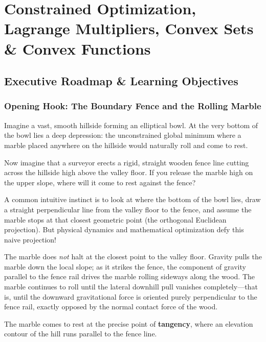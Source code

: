 \chapter[Constrained Optimization \& Convex Sets]{Constrained Optimization, Lagrange Multipliers, Convex Sets \& Convex Functions}
\label{chap:week09}

\section{Executive Roadmap \& Learning Objectives}

\subsection{Opening Hook: The Boundary Fence and the Rolling Marble}
Imagine a vast, smooth hillside forming an elliptical bowl. At the very bottom of the bowl lies a deep depression: the unconstrained global minimum where a marble placed anywhere on the hillside would naturally roll and come to rest. 

Now imagine that a surveyor erects a rigid, straight wooden fence line cutting across the hillside high above the valley floor. If you release the marble high on the upper slope, where will it come to rest against the fence?

A common intuitive instinct is to look at where the bottom of the bowl lies, draw a straight perpendicular line from the valley floor to the fence, and assume the marble stops at that closest geometric point (the orthogonal Euclidean projection). But physical dynamics and mathematical optimization defy this naive projection! 

The marble does \emph{not} halt at the closest point to the valley floor. Gravity pulls the marble down the local slope; as it strikes the fence, the component of gravity parallel to the fence rail drives the marble rolling sideways along the wood. The marble continues to roll until the lateral downhill pull vanishes completely---that is, until the downward gravitational force is oriented purely perpendicular to the fence rail, exactly opposed by the normal contact force of the wood. 

The marble comes to rest at the precise point of \textbf{tangency}, where an elevation contour of the hill runs parallel to the fence line. 

